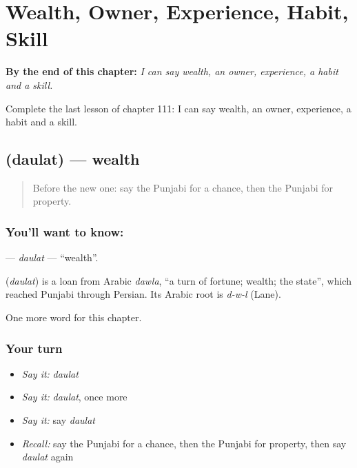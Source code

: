 
\chapter{Wealth, Owner, Experience, Habit, Skill}
\label{ch:pa-wealth-owner-experience-habit-skill}

\begin{chapteropening}
\textbf{By the end of this chapter:} \emph{I can say wealth, an owner, experience, a habit and a skill.}

Complete the last lesson of chapter 111: I can say wealth, an owner, experience, a habit and a skill.
\end{chapteropening}

\section[\texorpdfstring{\pa{ਦੌਲਤ} (daulat)}{ਦੌਲਤ (daulat)}]{ (daulat) — wealth}

\label{lesson:PA-C111-daulat}



\begin{quote}
Before the new one: say the Punjabi for a chance, then the Punjabi for property.
\end{quote}

\subsection*{You'll want to know: }
\textbf{} — \emph{daulat} — \textquotedblleft{}wealth\textquotedblright{}.

\begin{cousinweb}
\textbf{} (\emph{daulat}) is a loan from Arabic \emph{dawla}, \textquotedblleft{}a turn of fortune; wealth; the state\textquotedblright{}, which reached Punjabi through Persian. Its Arabic root is \emph{d-w-l} (Lane).
\end{cousinweb}

\begin{grammarlens}[title={What you've built}]
One more word for this chapter.
\end{grammarlens}

\subsection*{Your turn}
\begin{itemize}
\raggedright
  \item \emph{Say it:} \emph{daulat}
  \item \emph{Say it:} \emph{daulat}, once more
  \item \emph{Say it:} say \emph{daulat}
  \item \emph{Recall:} say the Punjabi for a chance, then the Punjabi for property, then say \emph{daulat} again
\end{itemize}

